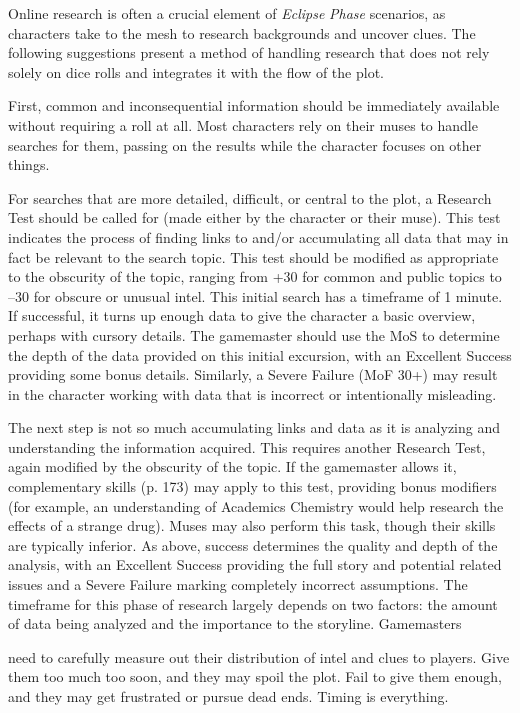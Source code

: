 Online research is often a crucial element of \textit{Eclipse } \textit{Phase} scenarios, as characters take to the mesh to research backgrounds and uncover clues. The following suggestions present a method of handling research that does not rely solely on dice rolls and integrates it with the flow of the plot. 

First, common and inconsequential information should be immediately available without requiring a roll at all. Most characters rely on their muses to handle searches for them, passing on the results while the character focuses on other things. 

For searches that are more detailed, difficult, or central to the plot, a Research Test should be called for (made either by the character or their muse). This test indicates the process of finding links to and/or accumulating all data that may in fact be relevant to the search topic. This test should be modified as appropriate to the obscurity of the topic, ranging from +30 for common and public topics to –30 for obscure or unusual intel. This initial search has a timeframe of 1 minute. If successful, it turns up enough data to give the character a basic overview, perhaps with cursory details. The gamemaster should use the MoS to determine the depth of the data provided on this initial excursion, with an Excellent Success providing some bonus details. Similarly, a Severe Failure (MoF 30+) may result in the character working with data that is incorrect or intentionally misleading. 

The next step is not so much accumulating links and data as it is analyzing and understanding the information acquired. This requires another Research Test, again modified by the obscurity of the topic. If the gamemaster allows it, complementary skills (p. 173) may apply to this test, providing bonus modifiers (for example, an understanding of Academics Chemistry would help research the effects of a strange drug). Muses may also perform this task, though their skills are typically inferior. As above, success determines the quality and depth of the analysis, with an Excellent Success providing the full story and potential related issues and a Severe Failure marking completely incorrect assumptions. The timeframe for this phase of research largely depends on two factors: the amount of data being analyzed and the importance to the storyline. Gamemasters 

need to carefully measure out their distribution of intel and clues to players. Give them too much too soon, and they may spoil the plot. Fail to give them enough, and they may get frustrated or pursue dead ends. Timing is everything. 

